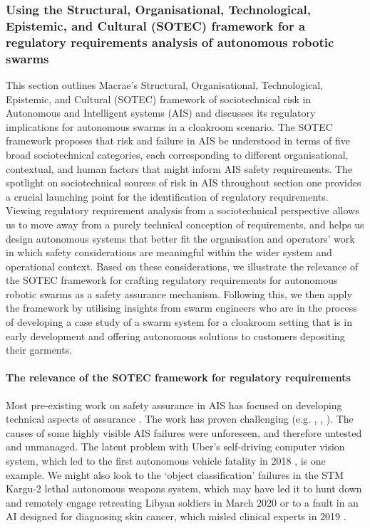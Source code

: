\documentclass[lettersize,journal]{IEEEtran}
\begin{document}

\subsubsection{Using the Structural, Organisational, Technological, Epistemic, and Cultural (SOTEC) framework for a regulatory requirements analysis of autonomous robotic swarms}

This section outlines Macrae’s \cite{macrae2021learning} Structural, Organisational, Technological, Epistemic, and Cultural (SOTEC) framework of sociotechnical risk in Autonomous and Intelligent systems (AIS) and discusses its regulatory implications for autonomous swarms in a cloakroom scenario. The SOTEC framework proposes that risk and failure in AIS be understood in terms of five broad sociotechnical categories, each corresponding to different organisational, contextual, and human factors that might inform AIS safety requirements. The spotlight on sociotechnical sources of risk in AIS throughout section one provides a crucial launching point for the identification of regulatory requirements. Viewing regulatory requirement analysis from a sociotechnical perspective allows us to move away from a purely technical conception of requirements, and helps us design autonomous systems that better fit the organisation and operators’ work in which safety considerations are meaningful within the wider system and operational context. Based on these considerations, we illustrate the relevance of the SOTEC framework for crafting regulatory requirements for autonomous robotic swarms as a safety assurance mechanism. Following this, we then apply the framework by utilising insights from swarm engineers who are in the process of developing a case study of a swarm system for a cloakroom setting that is in early development and offering autonomous solutions to customers depositing their garments.

\paragraph*{The relevance of the SOTEC framework for regulatory requirements}

Most pre-existing work on safety assurance in AIS has focused on developing technical aspects of assurance \cite{brundage2020toward}. The work has proven challenging (e.g. \cite{karvonen2020safety}, \cite{thieme2021proceedings}, \cite{sanchezexplainable}). The causes of some highly visible AIS failures were unforeseen, and therefore untested and unmanaged. The latent problem with Uber’s self-driving computer vision system, which led to the first autonomous vehicle fatality in 2018 \cite{Niedermeyer}, is one example. We might also look to the `object classification’ failures in the STM Kargu-2 lethal autonomous weapons system, which may have led it to hunt down and remotely engage retreating Libyan soldiers in March 2020 \cite{nasu2021kargu} or to a fault in an AI designed for diagnosing skin cancer, which misled clinical experts in 2019 \cite{tschandl2020human}.
\end{document}

